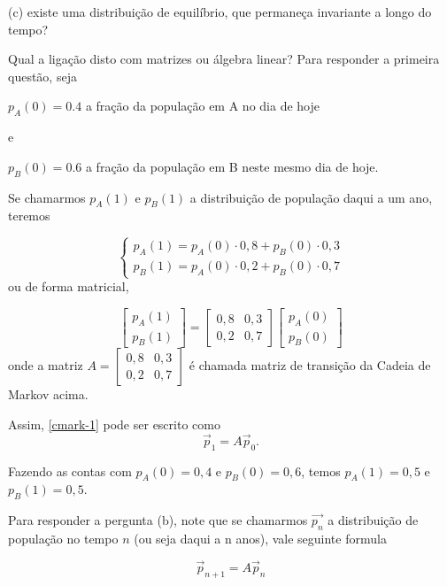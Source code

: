 (c) existe uma distribuição de equilíbrio, que permaneça invariante a longo do tempo?

\medskip
Qual a ligação disto com matrizes ou álgebra linear?
Para responder a primeira questão, seja
\medskip

$p_A(0)=0.4$ a fração da população em A no dia de hoje

e

$p_B(0)=0.6$ a fração da população em B neste mesmo dia de hoje.

Se chamarmos $p_A(1)$ e $p_B(1)$ a distribuição de população daqui a um ano, teremos

\begin{equation}\label{cmark-1}
\begin{cases}
p_A(1)=p_A(0) \cdot 0,8 + p_B(0) \cdot 0,3 \\
p_B(1)=p_A(0) \cdot 0,2 + p_B(0) \cdot 0,7
\end{cases}
\end{equation}
ou de forma  matricial,

$$\left[ \begin{array}{c} p_A(1)
\\ p_B(1)
\end{array} \right]  =
\left[ \begin{array}{cc} 0,8 & 0,3
\\ 0,2 & 0,7
\end{array} \right]
\left[ \begin{array}{c} p_A(0)
\\ p_B(0)
\end{array} \right]  $$
onde a matriz $A=\left[ \begin{array}{cc} 0,8 & 0,3
\\ 0,2 & 0,7
\end{array} \right]$
é chamada matriz de transição da Cadeia de Markov acima.

Assim, \eqref{cmark-1} pode ser escrito como
\begin{equation} \vec p_1 = A \vec p_0.\end{equation}

Fazendo as contas com $p_A(0)=0,4$ e $p_B(0)=0,6$, temos $p_A(1)=0,5$ e $p_B(1)=0,5$.

\medskip

Para responder a pergunta (b), note que se chamarmos $\vec{p_n}$ a distribuição de população no tempo $n$ (ou seja daqui a n anos), vale seguinte formula

\begin{equation}\label{cmark-2}
\vec p_{n+1} = A \vec p_n
\end{equation}

